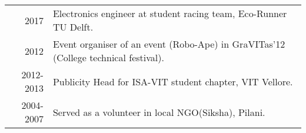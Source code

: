 %
%





\begin{tabular}{rl}	
	\textsc{2017} & Electronics engineer at student racing team, Eco-Runner TU Delft.\\
	\textsc{2012} & Event organiser of an event (Robo-Ape) in GraVITas'12 (College technical festival). \\
	\textsc{2012-2013} & Publicity Head for ISA-VIT student chapter, VIT Vellore. \\
	\textsc{2004-2007} & Served as a volunteer in local NGO(Siksha), Pilani.\\
\end{tabular}